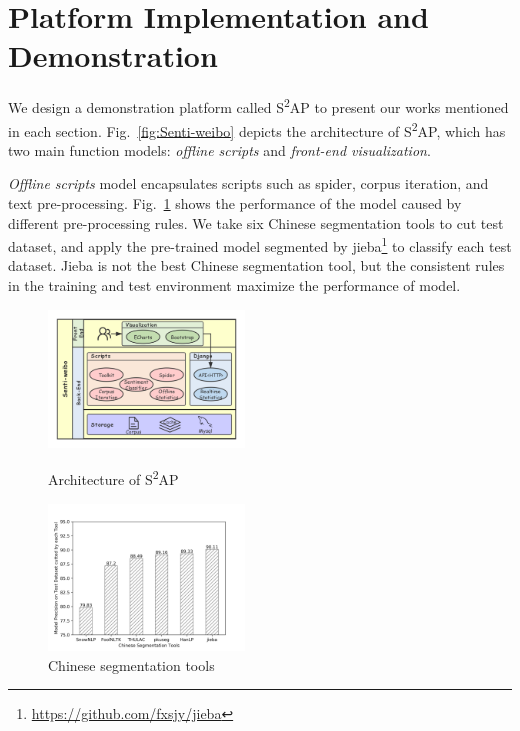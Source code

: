 \documentclass[runningheads]{llncs}
\begin{document}
\section{Platform Implementation and Demonstration}
We design a demonstration platform called S\textsuperscript{2}AP to present our works mentioned in each section. Fig.~\ref{fig:Senti-weibo} depicts the architecture of S\textsuperscript{2}AP, which has two main function models: \textit{offline scripts} and \textit{front-end visualization}.

\textit{Offline scripts} model encapsulates scripts such as spider, corpus iteration, and text pre-processing. Fig.~\ref{fig:segmentation-tools-precision} shows the performance of the model caused by different pre-processing rules. We take six Chinese segmentation tools to cut test dataset, and apply the pre-trained model segmented by jieba\footnote{\url{https://github.com/fxsjy/jieba}} to classify each test dataset. Jieba is not the best Chinese segmentation tool, but the consistent rules in the training and test environment maximize the performance of model.

\begin{figure}[htbp]
\vspace{-0.5cm}   %
\centering
\begin{minipage}[t]{0.43\textwidth}
\centering
\includegraphics[width=5.2cm]{images/Architecture-of-Senti-weibo-3.png}
\caption{Architecture of S\textsuperscript{2}AP}
\label{fig:Senti-weibo}
\end{minipage}
\begin{minipage}[t]{0.43\textwidth}
\centering
\includegraphics[width=5.2cm]{images/model-precision-on-test-dataset-cutted-by-each-tool.png}
\caption{Chinese segmentation tools}
\label{fig:segmentation-tools-precision}
\end{minipage}
\end{figure}
\end{document}
